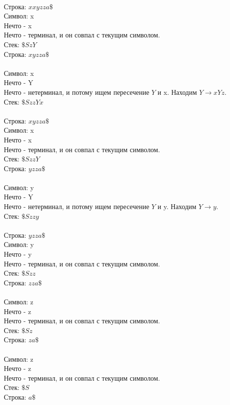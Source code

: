 \documentclass{article}
\begin{document}
\\
Строка: $xxyzza\$$\\
Символ: x\\
Нечто - x\\
Нечто - терминал, и он совпал с текущим символом.\\
Стек: $\$SzY$\\
Строка: $xyzza\$$\\
\\
Символ: x\\
Нечто - Y\\
Нечто - нетерминал, и потому ищем пересечение $Y$ и x. 
Находим $Y \to xYz$.\\
Стек: $\$SzzYx$\\
\\
Строка: $xyzza\$$\\
Символ: x\\
Нечто - x\\
Нечто - терминал, и он совпал с текущим символом.\\
Стек: $\$SzzY$\\
Строка: $yzza\$$\\
\\
Символ: y\\
Нечто - Y\\
Нечто - нетерминал, и потому ищем пересечение $Y$ и y. 
Находим $Y \to y$.\\
Стек: $\$Szzy$\\
\\
Строка: $yzza\$$\\
Символ: y\\
Нечто - y\\
Нечто - терминал, и он совпал с текущим символом.\\
Стек: $\$Szz$\\
Строка: $zza\$$\\
\\
Символ: z\\
Нечто - z\\
Нечто - терминал, и он совпал с текущим символом.\\
Стек: $\$Sz$\\
Строка: $za\$$\\
\\
Символ: z\\
Нечто - z\\
Нечто - терминал, и он совпал с текущим символом.\\
Стек: $\$S$\\
Строка: $a\$$\\
\\
\end{document}

